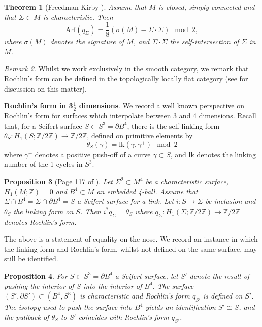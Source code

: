 \documentclass[10pt]{amsart}
\numberwithin{equation}{section}
\theoremstyle{plain}
\newtheorem{theorem}{Theorem}[section]
\newtheorem{proposition}[theorem]{Proposition}
\theoremstyle{definition}
\theoremstyle{remark}
\newtheorem{rmk}[theorem]{Remark}
\begin{document}
\begin{theorem}[Freedman-Kirby \cite{FreedmanKirby}] \label{ArfRochlin}
Assume that $M$ is closed, simply connected and that $\Sigma \subset M$ is characteristic. Then 
\[ \mathrm{Arf}(q_\Sigma) = \frac{1}{8}(\sigma(M) - \Sigma\cdot\Sigma) \mod 2,\]
where $\sigma(M)$ denotes the signature of $M$, and $\Sigma\cdot \Sigma$ the self-intersection of $\Sigma$ in $M$. 
\end{theorem}


\begin{rmk}
Whilst we work exclusively in the smooth category, we remark that Rochlin's form can be defined in the topologically locally flat category (see \cite{Klug} for discussion on this matter). 
\end{rmk}


\textbf{Rochlin's form in 3$\frac{1}{2}$ dimensions}. We record a well known perspective on Rochlin's form for surfaces which interpolate between 3 and 4 dimensions. Recall that, for a Seifert surface $S \subset S^3 = \partial B^4$, there is the self-linking form $\theta_S: H_1(S;\mathbb{Z}/2\mathbb{Z}) \to \mathbb{Z}/2\mathbb{Z}$, defined on primitive elements by \[\theta_S(\gamma) = \mathrm{lk}(\gamma,\gamma^+) \mod 2\] where $\gamma^+$ denotes a positive push-off of a curve $\gamma \subset S$, and $\mathrm{lk}$ denotes the linking number of the 1-cycles in $S^3$. 

\begin{proposition}[Page 117 of \cite{Saveliev}]
Let $\Sigma^2 \subset M^4$ be a characteristic surface, $H_1(M;\mathbb{Z}) = 0$ and $B^4 \subset M$ an embedded 4-ball. Assume that $ \Sigma \cap B^4 = \Sigma \cap \partial B^4 = S$ a Seifert surface for a link. Let $i : S \to \Sigma$ be inclusion and $\theta_S$ the linking form on $S$. Then $i^*q_{\Sigma} = \theta_S$ where $q_\Sigma : H_1(\Sigma;\mathbb{Z}/2\mathbb{Z}) \to \mathbb{Z}/2\mathbb{Z}$ denotes Rochlin's form. 
\label{Rochlinislink}
\end{proposition}


The above is a statement of equality on the nose. We record an instance in which the linking form and Rochlin's form, whilst not defined on the same surface, may still be identified. 

\begin{proposition} \label{pullbackRochlin}
For $S \subset S^3 = \partial B^4$ a Seifert surface, let $S'$ denote the result of pushing the interior of $S$ into the interior of $B^4$. The surface $(S',\partial S') \subset (B^4,S^3)$ is characteristic and Rochlin's form $q_{S'}$ is defined on $S'$. The isotopy used to push the surface into $B^4$ yields an identification $S' \cong S$, and the pullback of $\theta_S$ to $S'$ coincides with Rochlin's form $q_{S'}$. \end{proposition}
\end{document}
